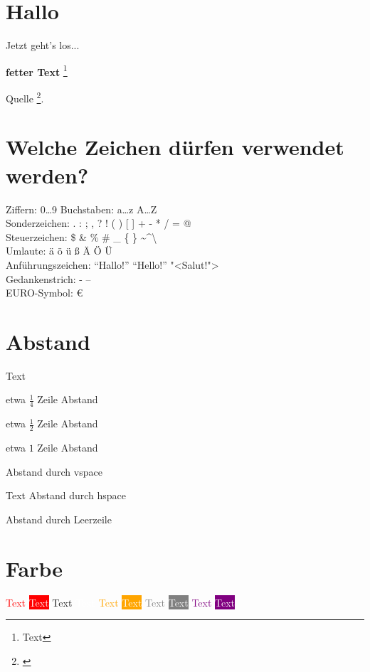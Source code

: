 \section*{Hallo} Jetzt geht's los...

\textbf{fetter Text} \footnote{Text}


Quelle \footnote{\textcite{kofler:2018:hacking}}.

\section{Welche Zeichen dürfen verwendet werden?}

Ziffern: 0…9
Buchstaben: a…z A…Z\\
Sonderzeichen:  . : ; , ? ! ( ) [ ] + - * / = @\\
Steuerzeichen: \$ \& \% \# \_ \{ \} \textasciitilde \textasciicircum \textbackslash \textbar \\
Umlaute: ä ö ü ß Ä Ö Ü\\
Anführungszeichen: "`Hallo!"' ``Hello!'' "<Salut!">\\
Gedankenstrich: - -- \\
EURO-Symbol: \euro

\section{Abstand}

Text

\smallskip etwa $\frac{1}{4}$ Zeile Abstand

\medskip etwa $\frac{1}{2}$ Zeile Abstand

\bigskip etwa $1$ Zeile Abstand

\vspace{2ex} %

Abstand durch vspace

Text \hspace{2em} Abstand durch hspace%

Abstand durch Leerzeile

\section{Farbe}

\textcolor{red}{Text} \colorbox{red}{\textcolor{white}{Text}}
\textcolor{blau}{Text} \colorbox{blau}{\textcolor{white}{Text}}
\textcolor{orange}{Text} \colorbox{orange}{\textcolor{white}{Text}}
\textcolor{gray}{Text} \colorbox{gray}{\textcolor{white}{Text}}
\textcolor{purple}{Text} \colorbox{purple}{\textcolor{white}{Text}}

